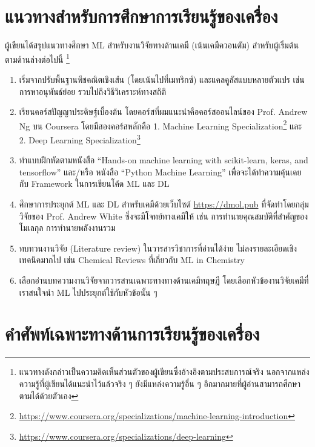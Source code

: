 \section{แนวทางสำหรับการศึกษาการเรียนรู้ของเครื่อง}

ผู้เขียนได้สรุปแนวทางศึกษา ML สำหรับงานวิจัยทางด้านเคมี (เน้นเคมีควอนตัม) สำหรับผู้เริ่มต้นตามด้านล่างต่อไปนี้
\footnote{แนวทางดังกล่าวเป็นความคิดเห็นส่วนตัวของผู้เขียนซึ่งอ้างอิงตามประสบการณ์จริง นอกจากแหล่งความรู้ที่ผู้เขียนได้แนะนำไว้แล้วจริง ๆ 
ยังมีแหล่งความรู้อื่น ๆ อีกมากมายที่ผู้อ่านสามารถศึกษาตามได้ด้วยตัวเอง}

\begin{enumerate}
    \item เริ่มจากปรับพื้นฐานพีชคณิตเชิงเส้น (โดยเน้นไปที่เมทริกซ์) และแคลคูลัสแบบหลายตัวแปร เช่น การหาอนุพันธ์ย่อย รวบไปถึงวิธีวิเคราะห์ทางสถิติ
    \item เรียนคอร์สปัญญาประดิษฐ์เบื้องต้น โดยคอร์สที่ผมแนะนำคือคอร์สออนไลน์ของ Prof. Andrew Ng บน Coursera โดยมีสองคอร์สหลักคือ 
    1. Machine Learning Specialization\footnote{\url{https://www.coursera.org/specializations/machine-learning-introduction}} และ 
    2. Deep Learning Specialization\footnote{\url{https://www.coursera.org/specializations/deep-learning}}
    \item ทำแบบฝึกหัดตามหนังสือ \enquote{Hands-on machine learning with scikit-learn, keras, and tensorflow} และ/หรือ 
    หนังสือ \enquote{Python Machine Learning} เพื่อจะได้ทำความคุ้นเคยกับ Framework ในการเขียนโค้ด ML และ DL
    \item ศึกษาการประยุกต์ ML และ DL สำหรับเคมีด้วยเว็บไซต์ \url{https://dmol.pub} ที่จัดทำโดยกลุ่มวิจัยของ Prof. Andrew White 
    ซึ่งจะมีโจทย์ทางเคมีให้ เช่น การทำนายคุณสมบัติที่สำคัญของโมเลกุล การทำนายพลังงานรวม
    \item ทบทวนงานวิจัย (Literature review) ในวารสารวิชาการที่อ่านได้ง่าย ไม่ลงรายละเอียดเชิงเทคนิคมากไป เช่น Chemical Reviews 
    ที่เกี่ยวกับ ML in Chemistry
    \item เลือกอ่านบทความงานวิจัยจากวารสานเฉพาะทางทางด้านเคมีทฤษฎี โดยเลือกหัวข้องานวิจัยเคมีที่เราสนใจนำ ML ไปประยุกต์ใช้กับหัวข้อนั้น ๆ
\end{enumerate}

\section{คำศัพท์เฉพาะทางด้านการเรียนรู้ของเครื่อง}

